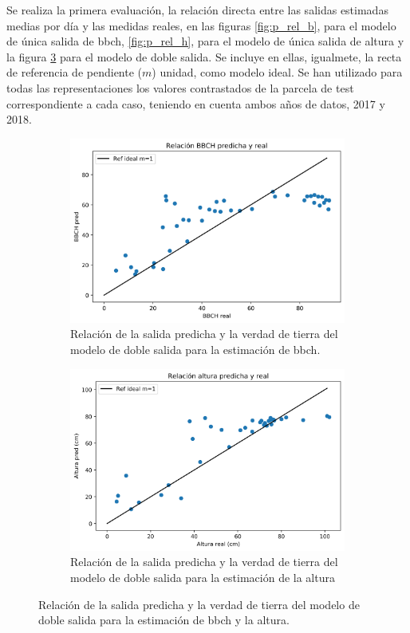 \par Se realiza la primera evaluación, la relación directa entre las salidas estimadas medias por día y las medidas reales, en las figuras \ref{fig:p_rel_b}, para el modelo de única salida de \gls{bbch}, \ref{fig:p_rel_h}, para el modelo de única salida de altura y la figura \ref{fig:p_rel_bh} para el modelo de doble salida. Se incluye en ellas, igualmete, la recta de referencia de pendiente ($m$) unidad, como modelo ideal. Se han utilizado para todas las representaciones los valores contrastados de la parcela de test correspondiente a cada caso, teniendo en cuenta ambos años de datos, 2017 y 2018.
\\
\begin{figure}[H]
\centering
\begin{subfigure}{0.7\textwidth}
  \centering
  \includegraphics[width=0.95\linewidth]{archivos/tfg/Pixel/BBCHH_RELACION_BIEN_b}
  \caption{Relación de la salida predicha y la verdad de tierra del modelo de doble salida para la estimación de \gls{bbch}. \label{fig:p_rel_bh_b}}
\end{subfigure}
\begin{subfigure}{0.7\textwidth}
  \centering
  \includegraphics[width=0.95\linewidth]{archivos/tfg/Pixel/BBCHH_RELACION_BIEN_H}
  \caption{Relación de la salida predicha y la verdad de tierra del modelo de doble salida para la estimación de la altura\label{fig:p_rel_bh_h}}
\end{subfigure}
\caption{Relación de la salida predicha y la verdad de tierra del modelo de doble salida para la estimación de \gls{bbch} y la altura. \label{fig:p_rel_bh}}
\end{figure}
